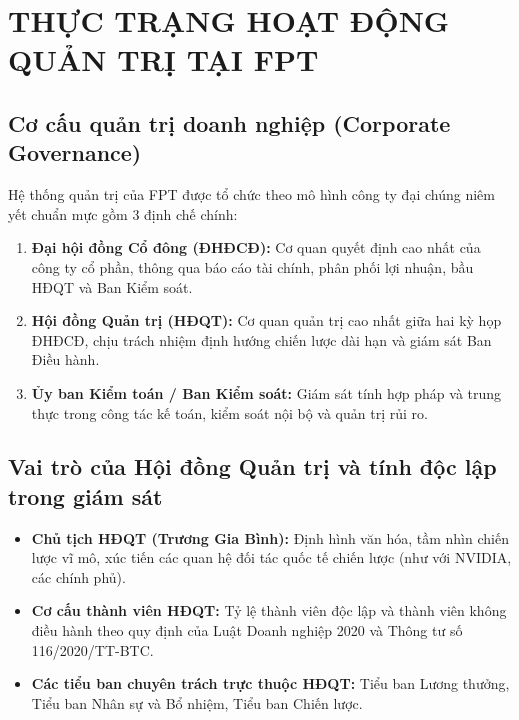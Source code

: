 \section{THỰC TRẠNG HOẠT ĐỘNG QUẢN TRỊ TẠI FPT}

\subsection{Cơ cấu quản trị doanh nghiệp (Corporate Governance)}
Hệ thống quản trị của FPT được tổ chức theo mô hình công ty đại chúng niêm yết chuẩn mực gồm 3 định chế chính:
\begin{enumerate}
    \item \textbf{Đại hội đồng Cổ đông (ĐHĐCĐ):} Cơ quan quyết định cao nhất của công ty cổ phần, thông qua báo cáo tài chính, phân phối lợi nhuận, bầu HĐQT và Ban Kiểm soát.
    \item \textbf{Hội đồng Quản trị (HĐQT):} Cơ quan quản trị cao nhất giữa hai kỳ họp ĐHĐCĐ, chịu trách nhiệm định hướng chiến lược dài hạn và giám sát Ban Điều hành.
    \item \textbf{Ủy ban Kiểm toán / Ban Kiểm soát:} Giám sát tính hợp pháp và trung thực trong công tác kế toán, kiểm soát nội bộ và quản trị rủi ro.
\end{enumerate}

\subsection{Vai trò của Hội đồng Quản trị và tính độc lập trong giám sát}
\begin{itemize}
    \item \textbf{Chủ tịch HĐQT (Trương Gia Bình):} Định hình văn hóa, tầm nhìn chiến lược vĩ mô, xúc tiến các quan hệ đối tác quốc tế chiến lược (như với NVIDIA, các chính phủ).
    \item \textbf{Cơ cấu thành viên HĐQT:} Tỷ lệ thành viên độc lập và thành viên không điều hành theo quy định của Luật Doanh nghiệp 2020 và Thông tư số 116/2020/TT-BTC.
    \item \textbf{Các tiểu ban chuyên trách trực thuộc HĐQT:} Tiểu ban Lương thưởng, Tiểu ban Nhân sự và Bổ nhiệm, Tiểu ban Chiến lược.
\end{itemize}

